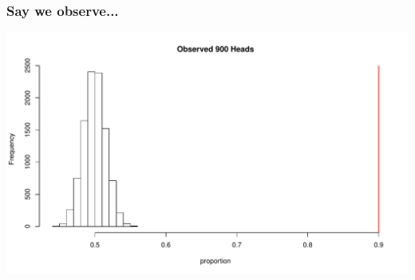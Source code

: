 \documentclass[handout]{beamer}
\newcommand{\blue}[1]{\textcolor{blue2}{#1}}
\begin{document}
\begin{frame}
\frametitle{Say we observe...}
\begin{center}
\includegraphics[width=\textwidth]{figure/hist4}
\end{center}
\end{frame}


%
%
%


%
%
%
%
%
%
\end{document}
